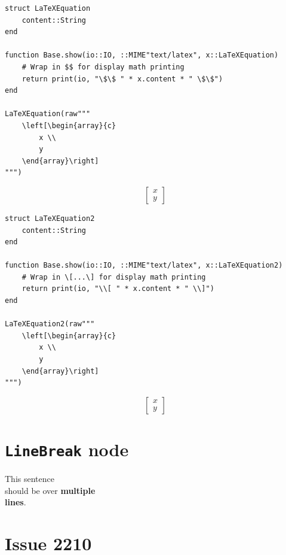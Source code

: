 \begin{verbatim}
struct LaTeXEquation
    content::String
end

function Base.show(io::IO, ::MIME"text/latex", x::LaTeXEquation)
    # Wrap in $$ for display math printing
    return print(io, "\$\$ " * x.content * " \$\$")
end

LaTeXEquation(raw"""
    \left[\begin{array}{c}
        x \\
        y
    \end{array}\right]
""")
\end{verbatim}

$$     \left[\begin{array}{c}
        x \\
        y
    \end{array}\right]
 $$


\begin{verbatim}
struct LaTeXEquation2
    content::String
end

function Base.show(io::IO, ::MIME"text/latex", x::LaTeXEquation2)
    # Wrap in \[...\] for display math printing
    return print(io, "\\[ " * x.content * " \\]")
end

LaTeXEquation2(raw"""
    \left[\begin{array}{c}
        x \\
        y
    \end{array}\right]
""")
\end{verbatim}

\[     \left[\begin{array}{c}
        x \\
        y
    \end{array}\right]
 \]

\section{\texttt{LineBreak} node}



\label{18112929726868774212}{}


This sentence\\
should be over \textbf{multiple\\
lines}.



\section{Issue 2210}



